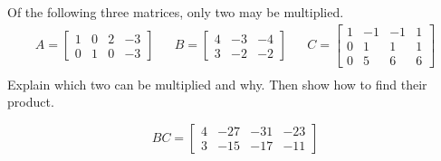 
\begin{exerciseStatement}


Of the following three matrices, only two may be multiplied. 
\begin{align*} A= \left[\begin{array}{cccc}
1 & 0 & 2 & -3 \\
0 & 1 & 0 & -3
\end{array}\right]  & & B= \left[\begin{array}{ccc}
4 & -3 & -4 \\
3 & -2 & -2
\end{array}\right]  & & C= \left[\begin{array}{cccc}
1 & -1 & -1 & 1 \\
0 & 1 & 1 & 1 \\
0 & 5 & 6 & 6
\end{array}\right]  \\ \end{align*}
             Explain which two can be multiplied and why. Then show how to find their product.


\end{exerciseStatement}
    
\begin{exerciseAnswer} 
\[BC= \left[\begin{array}{cccc}
4 & -27 & -31 & -23 \\
3 & -15 & -17 & -11
\end{array}\right] \]
\end{exerciseAnswer}
    
